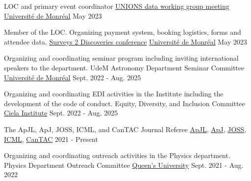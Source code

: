 \begin{cventries}
  \cventry
    {LOC and primary event coordinator} %
    {\href{https://www.skysurvey.cc/}{UNIONS data working group meeting}} %
    {\href{https://www.umontreal.ca/en/astrophysics/}{Universit{\'e} de Monr{\'e}al}} %
    {May 2023} %
    
  \cventry
    {Member of the LOC. Organizing payment system, booking logistics, forms and attendee data.} %
    {\href{https://www.s2dconference.com/}{Surveys 2 Discoveries conference}} %
    {\href{https://www.umontreal.ca/en/astrophysics/}{Universit{\'e} de Monr{\'e}al}} %
    {May 2023} %
    
  \cventry
    {Organizing and coordinating seminar program including inviting international speakers to the department.} %
    {UdeM Astronomy Department Seminar Committee} %
    {\href{https://www.umontreal.ca/en/astrophysics/}{Universit{\'e} de Monr{\'e}al}} %
    {Sept. 2022 - Aug. 2025} %
    
  \cventry
    {Organizing and coordinating EDI activities in the Institute including the development of the code of conduct.} %
    {Equity, Diversity, and Inclusion Committee} %
    {\href{https://www.umontreal.ca/}{Ciela Institute}} %
    {Sept. 2022 - Aug. 2025} %
    
  \cventry
    {The ApJL, ApJ, JOSS, ICML, and CanTAC} %
    {Journal Referee} %
    {\href{https://iopscience.iop.org/journal/2041-8205}{ApJL}, \href{https://iopscience.iop.org/journal/0004-637X}{ApJ}, \href{https://joss.theoj.org/}{JOSS}, \href{https://ml4astro.github.io/icml2022/}{ICML}, \href{https://nrc.canada.ca/en/research-development/products-services/technical-advisory-services/cantac-canadian-time-allocation-committee}{CanTAC}} %
    {2021 - Present} %

  \cventry
    {Organizing and coordinating outreach activities in the Physics department.} %
    {Physics Department Outreach Committee} %
    {\href{https://www.queensu.ca/}{Queen's University}} %
    {Sept. 2021 - Aug. 2022} %
    

\end{cventries}
